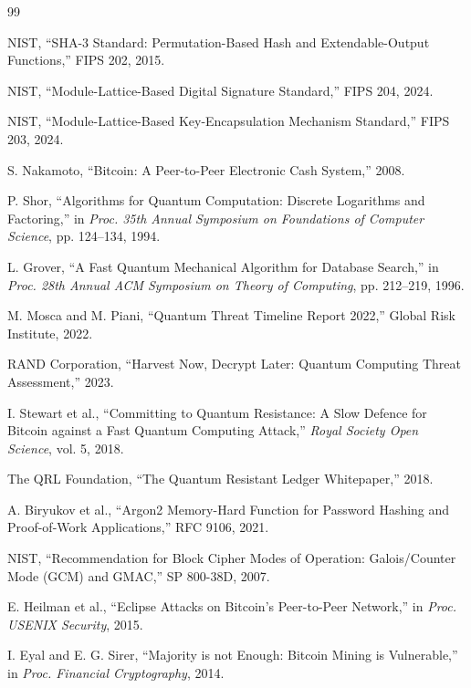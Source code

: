 \documentclass[11pt,a4paper]{article}
\begin{document}

\begin{thebibliography}{99}

NIST, ``SHA-3 Standard: Permutation-Based Hash and Extendable-Output Functions,'' FIPS 202, 2015.

NIST, ``Module-Lattice-Based Digital Signature Standard,'' FIPS 204, 2024.

NIST, ``Module-Lattice-Based Key-Encapsulation Mechanism Standard,'' FIPS 203, 2024.

S. Nakamoto, ``Bitcoin: A Peer-to-Peer Electronic Cash System,'' 2008.

P. Shor, ``Algorithms for Quantum Computation: Discrete Logarithms and Factoring,'' in \textit{Proc. 35th Annual Symposium on Foundations of Computer Science}, pp. 124--134, 1994.

L. Grover, ``A Fast Quantum Mechanical Algorithm for Database Search,'' in \textit{Proc. 28th Annual ACM Symposium on Theory of Computing}, pp. 212--219, 1996.

M. Mosca and M. Piani, ``Quantum Threat Timeline Report 2022,'' Global Risk Institute, 2022.

RAND Corporation, ``Harvest Now, Decrypt Later: Quantum Computing Threat Assessment,'' 2023.

I. Stewart et al., ``Committing to Quantum Resistance: A Slow Defence for Bitcoin against a Fast Quantum Computing Attack,'' \textit{Royal Society Open Science}, vol. 5, 2018.

The QRL Foundation, ``The Quantum Resistant Ledger Whitepaper,'' 2018.

A. Biryukov et al., ``Argon2 Memory-Hard Function for Password Hashing and Proof-of-Work Applications,'' RFC 9106, 2021.

NIST, ``Recommendation for Block Cipher Modes of Operation: Galois/Counter Mode (GCM) and GMAC,'' SP 800-38D, 2007.

E. Heilman et al., ``Eclipse Attacks on Bitcoin's Peer-to-Peer Network,'' in \textit{Proc. USENIX Security}, 2015.

I. Eyal and E. G. Sirer, ``Majority is not Enough: Bitcoin Mining is Vulnerable,'' in \textit{Proc. Financial Cryptography}, 2014.


\end{thebibliography}
\end{document}
